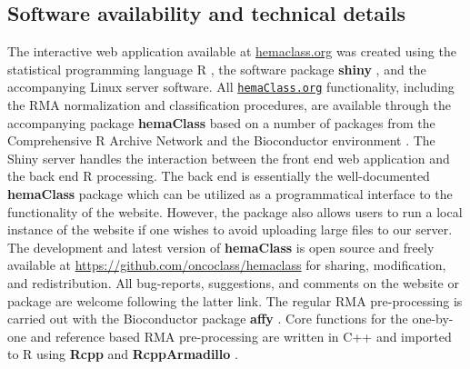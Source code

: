 \documentclass[10pt,letterpaper]{article}
\newcommand{\hemaClass}{\href{http://hemaClass.org}{\texttt{hemaClass.org}}}
\newcommand{\R}{\textsf{R}}
\newcommand{\pkg}[1]{\textbf{#1}}
\begin{document}
\subsection*{Software availability and technical details}
The interactive web application available at \url{hemaclass.org} was created using the statistical programming language \R{} \cite{RCoreTeam}, the software package \pkg{shiny} \cite{shiny}, and the accompanying Linux server software.
All \hemaClass{} functionality, including the RMA normalization and classification procedures, are available through the accompanying package \pkg{hemaClass} based on a number of packages from the Comprehensive R Archive Network \cite{RCoreTeam} and the Bioconductor environment \cite{Gentleman2004}.
The Shiny server handles the interaction between the front end web application and the back end \R{} processing.
The back end is essentially the well-documented \pkg{hemaClass} package which can be utilized as a programmatical interface to the functionality of the website.
However, the package also allows users to run a local instance of the website if one wishes to avoid uploading large files to our server.
The development and latest version of \pkg{hemaClass} is open source and freely available at \url{https://github.com/oncoclass/hemaclass} for sharing, modification, and redistribution.
All bug-reports, suggestions, and comments on the website or package are welcome following the latter link.
The regular RMA pre-processing is carried out with the Bioconductor package \pkg{affy} \cite{Gautier2004}.
Core functions for the one-by-one and reference based RMA pre-processing are written in \textsf{C++} and imported to \R{} using \pkg{Rcpp} and \pkg{RcppArmadillo} \cite{Rcpp2013,Eddelbuettel2011,RcppArmadillo,Sanderson2010}.
\end{document}
